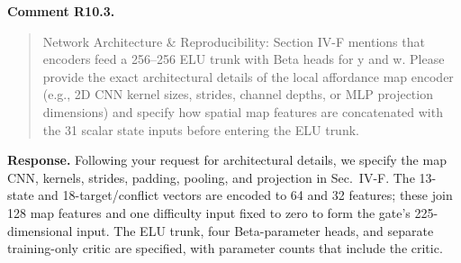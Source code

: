 \documentclass[letterpaper,11pt]{article}
\begin{document}
\noindent\textbf{Comment R10.3.}
\begin{quote}\color{reviewgray}
Network Architecture \& Reproducibility: Section IV-F mentions that encoders feed a 256–256 ELU trunk with Beta heads for y and w. Please provide the exact architectural details of the local affordance map encoder (e.g., 2D CNN kernel sizes, strides, channel depths, or MLP projection dimensions) and specify how spatial map features are concatenated with the 31 scalar state inputs before entering the ELU trunk.
\end{quote}
\noindent\textbf{Response.}
Following your request for architectural details, we specify the map CNN, kernels, strides, padding, pooling, and projection in Sec.~IV-F. The 13-state and 18-target/conflict vectors are encoded to 64 and 32 features; these join 128 map features and one difficulty input fixed to zero to form the gate's 225-dimensional input. The ELU trunk, four Beta-parameter heads, and separate training-only critic are specified, with parameter counts that include the critic.
\par\nopagebreak[4]
\end{document}
